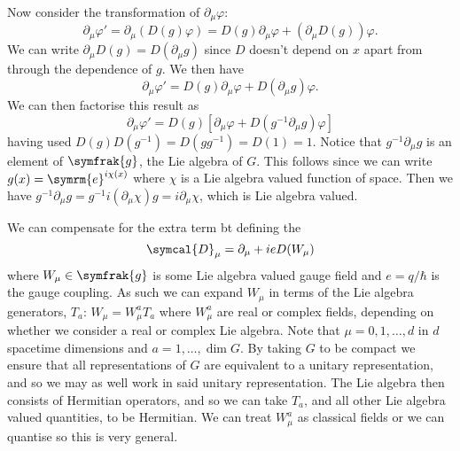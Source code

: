 \documentclass[fleqn]{NotesClass}
\newcommand{\e}{\symrm{e}}
\newcommand{\ident}{1}
\renewcommand{\lie}[1]{\symfrak{#1}}
\newcommand{\covariantDerivative}{\symcal{D}}
\begin{document}
    Now consider the transformation of \(\partial_\mu \varphi\):
    \begin{equation}
        \partial_\mu \varphi' = \partial_\mu (D(g)\varphi) = D(g)\partial_\mu \varphi + (\partial_\mu D(g)) \varphi.
    \end{equation}
    We can write \(\partial_\mu D(g) = D(\partial_\mu g)\) since \(D\) doesn't depend on \(x\) apart from through the dependence of \(g\).
    We then have
    \begin{equation}
        \partial_\mu \varphi' = D(g)\partial_\mu \varphi + D(\partial_\mu g)\varphi.
    \end{equation}
    We can then factorise this result as
    \begin{equation}
        \partial_\mu \varphi' = D(g)[\partial_\mu \varphi + D(g^{-1}\partial_\mu g)\varphi]
    \end{equation}
    having used \(D(g)D(g^{-1}) = D(gg^{-1}) = D(\ident) = \ident\).
    Notice that \(g^{-1}\partial_\mu g\) is an element of \(\lie{g}\), the Lie algebra of \(G\).
    This follows since we can write \(g(x) = \e^{i\chi(x)}\) where \(\chi\) is a Lie algebra valued function of space.
    Then we have \(g^{-1}\partial_\mu g = g^{-1}i(\partial_\mu \chi)g = i\partial_\mu \chi\), which is Lie algebra valued.
    
    We can compensate for the extra term bt defining the 
    \begin{equation}
        \covariantDerivative_\mu = \partial_\mu + ieD(W_\mu)
    \end{equation}
    where \(W_\mu \in \lie{g}\) is some Lie algebra valued gauge field and \(e = q/\hbar\) is the gauge coupling.
    As such we can expand \(W_\mu\) in terms of the Lie algebra generators, \(T_a\): \(W_\mu = W^a_\mu T_a\) where \(W_\mu^a\) are real or complex fields, depending on whether we consider a real or complex Lie algebra.
    Note that \(\mu = 0, 1, \dotsc, d\) in \(d\) spacetime dimensions and \(a = 1, \dotsc, \dim G\).
    By taking \(G\) to be compact we ensure that all representations of \(G\) are equivalent to a unitary representation, and so we may as well work in said unitary representation.
    The Lie algebra then consists of Hermitian operators, and so we can take \(T_a\), and all other Lie algebra valued quantities, to be Hermitian.
    We can treat \(W_\mu^a\) as classical fields or we can quantise so this is very general.
    
\end{document}
